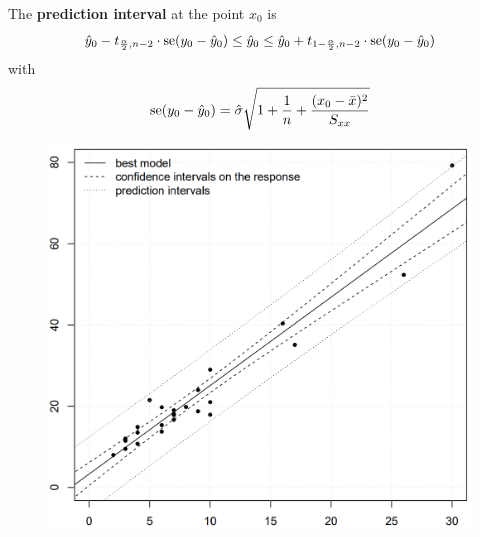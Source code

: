 The \textbf{prediction interval} at the point $x_0$ is
\begin{equation}
  \hat{y}_0 - t_{\frac{\alpha}{2},n-2} \cdot \textup{se}(y_0 - \hat{y}_0)
  \leq \hat{y}_0 \leq
  \hat{y}_0 + t_{1 - \frac{\alpha}{2},n-2} \cdot \textup{se}(y_0 - \hat{y}_0)
\end{equation}
with
\begin{equation}
  \textup{se}(y_0 - \hat{y}_0) = \hat{\sigma}\sqrt{1 + \frac{1}{n} + \frac{(x_0 - \bar{x})^2}{S_{xx}}}
\end{equation}

\begin{figure}[H]
  \centering
  \includegraphics[width=0.8\linewidth]{Pics/7.4.png}
\end{figure}
